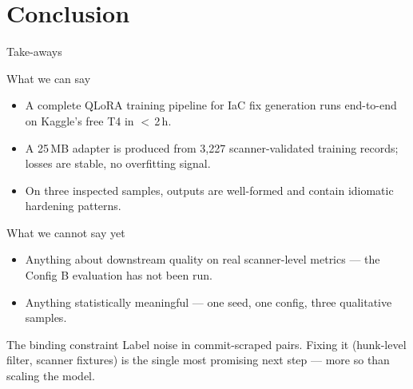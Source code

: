 \documentclass[aspectratio=169, 10pt]{beamer}
\begin{document}
\section{Conclusion}

\begin{frame}{Take-aways}
  \begin{exampleblock}{What we can say}
    \scriptsize
    \begin{itemize}
      \item A complete QLoRA training pipeline for IaC fix generation
            runs end-to-end on Kaggle's free T4 in $<$\,2\,h.
      \item A 25\,MB adapter is produced from 3{,}227 scanner-validated
            training records; losses are stable, no overfitting signal.
      \item On three inspected samples, outputs are well-formed and
            contain idiomatic hardening patterns.
    \end{itemize}
  \end{exampleblock}
  \begin{alertblock}{What we cannot say yet}
    \scriptsize
    \begin{itemize}
      \item Anything about downstream quality on real scanner-level
            metrics --- the Config B evaluation has not been run.
      \item Anything statistically meaningful --- one seed, one config,
            three qualitative samples.
    \end{itemize}
  \end{alertblock}
  \begin{block}{The binding constraint}
    \scriptsize
    Label noise in commit-scraped pairs. Fixing it (hunk-level filter,
    scanner fixtures) is the single most promising next step --- more so
    than scaling the model.
  \end{block}
\end{frame}
\end{document}
